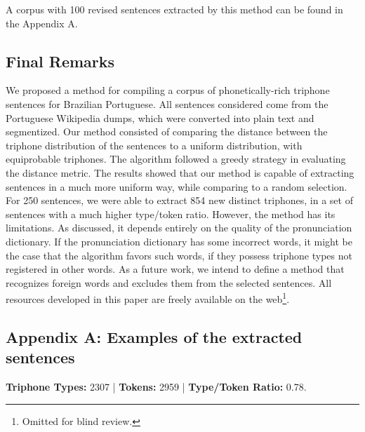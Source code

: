 A corpus with 100 revised sentences extracted by this method can be found in the Appendix A.

\clearpage
\subsection{Final Remarks}

We proposed a method for compiling a corpus of phonetically-rich triphone sentences for Brazilian Portuguese.
All sentences considered come from the Portuguese Wikipedia dumps, which were converted into plain
text and segmentized. Our method consisted of comparing the distance between the triphone distribution
of the sentences to a uniform distribution, with equiprobable triphones. The algorithm followed
a greedy strategy in evaluating the distance metric. The results showed that our method is capable 
of extracting sentences in a much more uniform way, while comparing to a random selection. 
For 250 sentences, we were able to extract 854 new distinct triphones, in a set of sentences
with a much higher type/token ratio. However, the method has its limitations. As discussed,
it depends entirely on the quality of the pronunciation dictionary. If the pronunciation dictionary
has some incorrect words, it might be the case that the algorithm favors such words, if they possess
triphone types not registered in other words. As a future work, we intend to define a method that recognizes foreign words and excludes them from the selected sentences. All resources developed in this paper are freely available on the web\footnote{Omitted for blind review.}.

\subsection{Appendix A: Examples of the extracted sentences}

\textbf{Triphone Types:} 2307 | \textbf{Tokens:} 2959 | \textbf{Type/Token Ratio:} 0.78.

